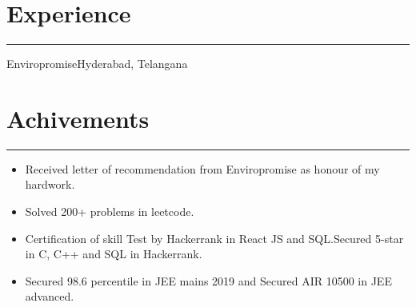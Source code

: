 \documentclass[]{sundar}
\begin{document}
\begin{minipage}[t]{0.66\textwidth}
\section{Experience}
\noindent\rule{12.5cm}{0.4pt}
        {Enviropromise}{Hyderabad, Telangana}
  
\vspace{6pt}





\section{Achivements}
\noindent\rule{12.5cm}{0.4pt}

    	\begin{itemize}
    	 \item Received letter of recommendation from Enviropromise  as honour of my  hardwork. 
    	 \item Solved 200+ problems in leetcode.
          \item Certification of skill Test by Hackerrank in React JS and SQL.Secured 5-star in C, C++ and SQL in Hackerrank. 
          \item Secured 98.6 percentile in JEE mains 2019 and Secured AIR 10500 in JEE advanced.

		\end{itemize}



\end{minipage}
 
\end{document}

